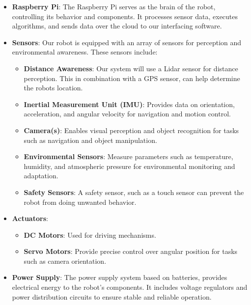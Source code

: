 \documentclass[a4paper]{article}
\begin{document}
\begin{itemize}
    \item \textbf{Raspberry Pi}: The Raspberry Pi serves as the brain of the robot, controlling its behavior and components. It processes sensor data, executes algorithms, and sends data over the cloud to our interfacing software.
    
    \item \textbf{Sensors}: Our robot is equipped with an array of sensors for perception and environmental awareness. These sensors include:
    \begin{itemize}
        \item \textbf{Distance Awareness}: Our system will use a Lidar sensor for distance perception. This in combination with a GPS sensor, can help determine the robots location.
        \item \textbf{Inertial Measurement Unit (IMU)}: Provides data on orientation, acceleration, and angular velocity for navigation and motion control.
        \item \textbf{Camera(s)}: Enables visual perception and object recognition for tasks such as navigation and object manipulation.
        \item \textbf{Environmental Sensors}: Measure parameters such as temperature, humidity, and atmospheric pressure for environmental monitoring and adaptation.
        \item \textbf{Safety Sensors}: A safety sensor, such as a touch sensor can prevent the robot from doing unwanted behavior. 
    \end{itemize}
    
    \item \textbf{Actuators}: 
    \begin{itemize}
        \item \textbf{DC Motors}: Used for driving mechanisms.
        \item \textbf{Servo Motors}: Provide precise control over angular position for tasks such as camera orientation.
    \end{itemize}
    
    \item \textbf{Power Supply}: The power supply system based on batteries, provides electrical energy to the robot's components. It includes voltage regulators and power distribution circuits to ensure stable and reliable operation.
    
\end{itemize}
\end{document}
